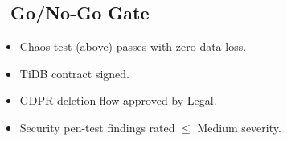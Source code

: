 \subsection*{\faFlag\ Go/No-Go Gate}

\begin{dangerbox}
  \begin{itemize}
    \item Chaos test (above) passes with zero data loss.
    \item TiDB contract signed.
    \item GDPR deletion flow approved by Legal.
    \item Security pen-test findings rated $\leq$ Medium severity.
  \end{itemize}
\end{dangerbox}

